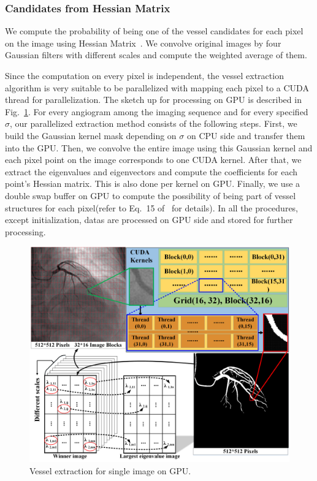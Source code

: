 \documentclass[journal]{IEEEtran}
\begin{document}
\subsubsection{\textbf{Candidates from Hessian Matrix}}
\label{subsubsec:hessian}
We compute the probability of being one of the vessel candidates for each pixel on the image using Hessian Matrix~\cite{Frangi}. We convolve original images by four Gaussian filters with different scales and compute the weighted average of them.

Since the computation on every pixel is independent, the vessel extraction algorithm is very suitable to be parallelized with mapping each pixel to a CUDA thread for parallelization. The sketch up for processing on GPU is described in Fig.~\ref{fig:hessian_gpu}. For every angiogram among the imaging sequence and for every specified $\sigma$, our parallelized extraction method consists of the following steps. First, we build the Gaussian kernel mask depending on $\sigma$ on CPU side and transfer them into the GPU. Then, we convolve the entire image using this Gaussian kernel and each pixel point on the image corresponds to one CUDA kernel. After that, we extract the eigenvalues and eigenvectors and compute the coefficients for each point's Hessian matrix. This is also done per kernel on GPU. Finally, we use a double swap buffer on GPU to compute the possibility of being part of vessel structures for each pixel(refer to Eq.~15 of~\cite{Frangi} for details). In all the procedures, except initialization, datas are processed on GPU side and stored for further processing.

\begin{figure}[!t]
\centering
\includegraphics[width=1.0\linewidth]{./images/hessian_gpu.png}
\caption{Vessel extraction for single image on GPU.}
\label{fig:hessian_gpu}
\end{figure}
\end{document}
